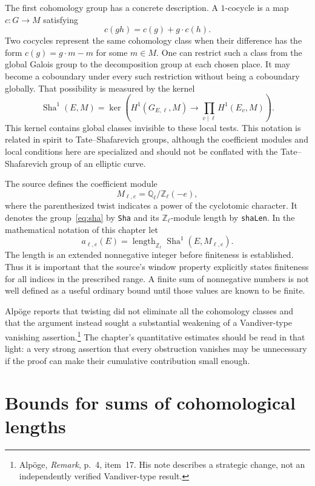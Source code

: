 \documentclass[11pt,openany,oneside]{scrbook}
\theoremstyle{definition}
\theoremstyle{remark}
\newcommand{\QQ}{\mathbb Q}
\newcommand{\ZZ}{\mathbb Z}
\newcommand{\Shasym}{\operatorname{Sha}}
\begin{document}
The first cohomology group has a concrete description. A $1$-cocycle is a map $c:G\to M$ satisfying
\[
c(gh)=c(g)+g\cdot c(h).
\]
Two cocycles represent the same cohomology class when their difference has the form $c(g)=g\cdot m-m$ for some $m\in M$. One can restrict such a class from the global Galois group to the decomposition group at each chosen place. It may become a coboundary under every such restriction without being a coboundary globally. That possibility is measured by the kernel
\begin{equation}\label{eq:sha}
\Shasym^1(E,M)
=\ker\!\left(H^1(G_{E,\ell},M)
\longrightarrow\prod_{v\mid\ell}H^1(E_v,M)\right).
\end{equation}
This kernel contains global classes invisible to these local tests. This notation is related in spirit to Tate--Shafarevich groups, although the coefficient modules and local conditions here are specialized and should not be conflated with the Tate--Shafarevich group of an elliptic curve.

The source defines the coefficient module
\[
M_{\ell,e}=\QQ_\ell/\ZZ_\ell(-e),
\]
where the parenthesized twist indicates a power of the cyclotomic character. It denotes the group~\eqref{eq:sha} by \texttt{Sha} and its $\ZZ_\ell$-module length by \texttt{shaLen}. In the mathematical notation of this chapter let
\[
a_{\ell,e}(E)=\operatorname{length}_{\ZZ_\ell}\Shasym^1(E,M_{\ell,e}).
\]
The length is an extended nonnegative integer before finiteness is established. Thus it is important that the source's window property explicitly states finiteness for all indices in the prescribed range. A finite sum of nonnegative numbers is not well defined as a useful ordinary bound until those values are known to be finite.

Alp\"oge reports that twisting did not eliminate all the cohomology classes and that the argument instead sought a substantial weakening of a Vandiver-type vanishing assertion.\footnote{Alp\"oge, \emph{Remark}, p.~4, item~17. His note describes a strategic change, not an independently verified Vandiver-type result.} The chapter's quantitative estimates should be read in that light: a very strong assertion that every obstruction vanishes may be unnecessary if the proof can make their cumulative contribution small enough.

\section{Bounds for sums of cohomological lengths}
\end{document}
